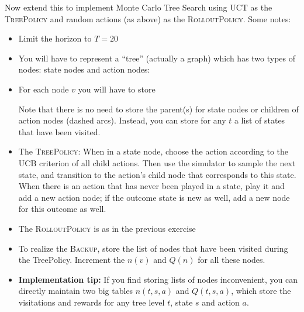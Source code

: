 Now extend this to implement Monte Carlo Tree Search using UCT as
the \textsc{TreePolicy} and random actions (as above) as
the \textsc{RolloutPolicy}. Some notes:
\begin{itemize}
\item Limit the horizon to $T=20$
\item You will have to represent a ``tree'' (actually a graph) which has
two types of nodes: state nodes and action nodes:

\item For each node $v$ you will have to store
Note that there is no need to store the parent(s) for state nodes or
children of action nodes (dashed arcs). Instead, you can store for any
$t$ a list of states that have been visited.
\item The \textsc{TreePolicy}: When in a state node, choose the action
according to the UCB criterion of all child actions. Then use the
simulator to sample the next state, and transition to the action's
child node that corresponds to this state. When there is an action
that has never been played in a state, play it and add a new action
node; if the outcome state is new as well, add a new node for this
outcome as well.
\item The \textsc{RolloutPolicy} is as in the previous exercise
\item To realize the \textsc{Backup}, store the list of nodes that have been
visited during the TreePolicy. Increment the $n(v)$ and $Q(n)$ for all
these nodes.
\item \textbf{Implementation tip:} If you find storing lists of nodes
inconvenient, you can directly maintain two big tables $n(t,s,a)$ and
$Q(t,s,a)$, which store the visitations and rewards for any tree level
$t$, state $s$ and action $a$.
\end{itemize}

